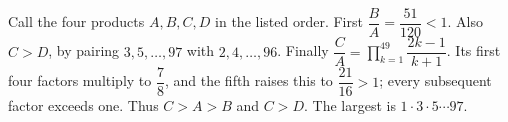 Call the four products $A,B,C,D$ in the listed order. First $\dfrac{B}{A} = \dfrac{51}{120} < 1$. Also $C>D$, by pairing $3,5,\ldots,97$ with $2,4,\ldots,96$. Finally $\dfrac{C}{A} = \prod_{k=1}^{49} \dfrac{2k-1}{k+1}$. Its first four factors multiply to $\dfrac{7}{8}$, and the fifth raises this to $\dfrac{21}{16}>1$; every subsequent factor exceeds one. Thus $C>A>B$ and $C>D$. The largest is $\boxed{1\cdot3\cdot5\cdots97}$.

